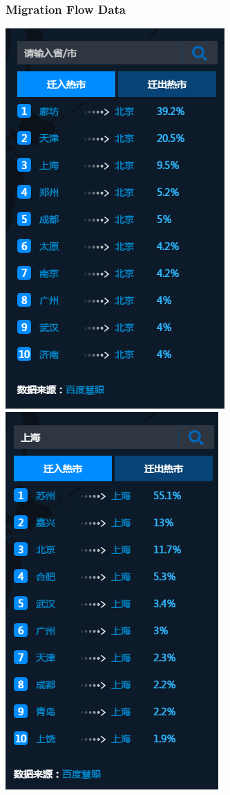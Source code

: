 \documentclass[10pt]{beamer}
\begin{document}
\begin{frame}[c]\frametitle{Migration Flow Data}

\includegraphics[height=0.8\textheight]{baidu2.png}
\hfill
\includegraphics[height=0.8\textheight]{baidu4.png}


\end{frame}
\end{document}
